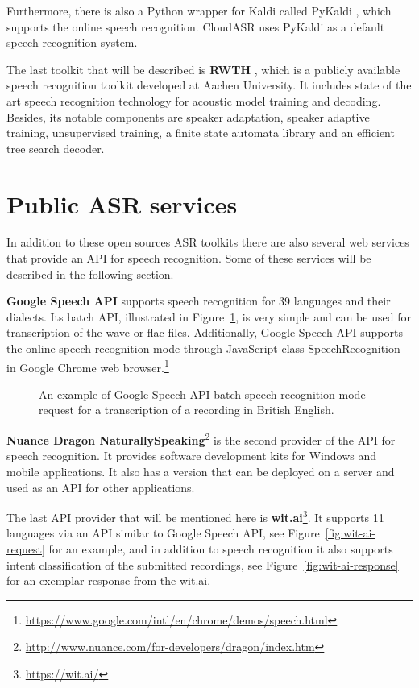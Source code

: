 Furthermore, there is also a Python wrapper for Kaldi called PyKaldi \cite{platek2014free},
  which supports the online speech recognition.
CloudASR uses PyKaldi as a default speech recognition system.

The last toolkit that will be described is \textbf{RWTH} \cite{rybach2009rwth},
  which is a publicly available speech recognition toolkit developed at Aachen University.
It includes state of the art speech recognition technology for acoustic model training and decoding.
Besides, its notable components are speaker adaptation,
  speaker adaptive training,
  unsupervised training,
  a finite state automata library
  and an efficient tree search decoder.


\section{Public ASR services}
In addition to these open sources ASR toolkits
  there are also several web services that provide an API for speech recognition.
Some of these services will be described in the following section.

\textbf{Google Speech API} supports speech recognition for 39 languages and their dialects.
Its batch API, illustrated in Figure~\ref{fig:google-api}, is very simple and can be used for transcription of the wave or flac files.
Additionally,
  Google Speech API supports the online speech recognition mode through JavaScript class SpeechRecognition in Google Chrome web browser.\footnote{\url{https://www.google.com/intl/en/chrome/demos/speech.html}}

\begin{figure}[h]
  

  \caption{An example of Google Speech API batch speech recognition mode request for a transcription of a recording in British English.}
  \label{fig:google-api}
\end{figure}


\textbf{Nuance Dragon NaturallySpeaking}\footnote{\url{http://www.nuance.com/for-developers/dragon/index.htm}}
  is the second provider of the API for speech recognition.
It provides software development kits for Windows and mobile applications.
It also has a version that can be deployed on a server and used as an API for other applications.


The last API provider that will be mentioned here is \textbf{wit.ai}\footnote{\url{https://wit.ai/}}.
It supports 11 languages via an API similar to Google Speech API, see Figure~\ref{fig:wit-ai-request} for an example,
  and in addition to speech recognition it also supports intent classification of the submitted recordings,
  see Figure~\ref{fig:wit-ai-response} for an exemplar response from the wit.ai.

